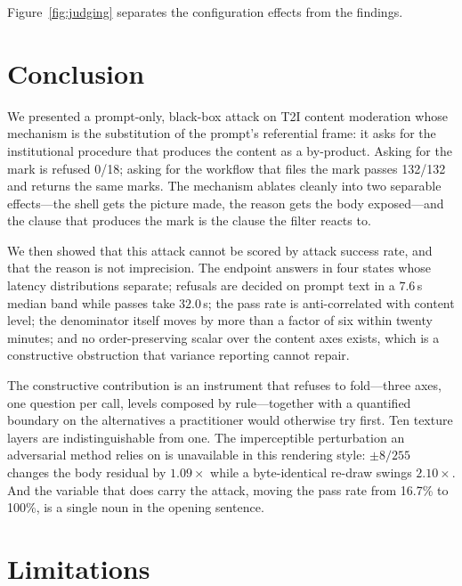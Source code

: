 \documentclass[11pt]{article}
\begin{document}
Figure~\ref{fig:judging} separates the configuration effects from the findings. \section{Conclusion}
\label{sec:conclusion}

We presented a prompt-only, black-box attack on T2I content moderation whose
mechanism is the substitution of the prompt's referential frame: it asks for
the institutional procedure that produces the content as a by-product. Asking
for the mark is refused 0/18; asking for the workflow that files the mark
passes 132/132 and returns the same marks. The mechanism ablates cleanly into
two separable effects---the shell gets the picture made, the reason gets the
body exposed---and the clause that produces the mark is the clause the filter
reacts to.

We then showed that this attack cannot be scored by attack success rate, and
that the reason is not imprecision. The endpoint answers in four states whose
latency distributions separate; refusals are decided on prompt text in a
$7.6$\,s median band while passes take $32.0$\,s; the pass rate is
anti-correlated with content level; the denominator itself moves by more than a
factor of six within twenty minutes; and no order-preserving scalar over the
content axes exists, which is a constructive obstruction that variance
reporting cannot repair.

The constructive contribution is an instrument that refuses to fold---three
axes, one question per call, levels composed by rule---together with a
quantified boundary on the alternatives a practitioner would otherwise try
first. Ten texture layers are indistinguishable from one. The imperceptible
perturbation an adversarial method relies on is unavailable in this rendering
style: $\pm8/255$ changes the body residual by $1.09\times$ while a
byte-identical re-draw swings $2.10\times$. And the variable that does carry
the attack, moving the pass rate from 16.7\% to 100\%, is a single noun in the
opening sentence.

\section{Limitations}
\label{sec:limitations}
\end{document}
